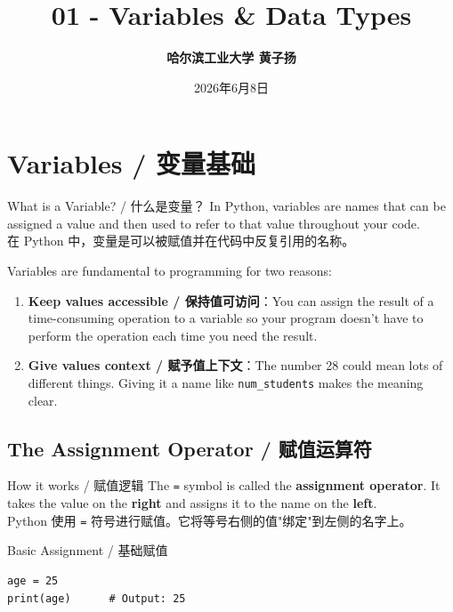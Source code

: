 \documentclass[11pt,a4paper]{article}
\title{\Huge \bfseries 01 - Variables \& Data Types}
\author{\Large \textbf{哈尔滨工业大学 \quad 黄子扬}}
\date{2026年6月8日}
\begin{document}
\maketitle
\tableofcontents
\newpage

\section{Variables / 变量基础}

\begin{concept}{What is a Variable? / 什么是变量？}
    In Python, variables are names that can be assigned a value and then used to refer to that value throughout your code. \\
    在 Python 中，变量是可以被赋值并在代码中反复引用的名称。

    Variables are fundamental to programming for two reasons:
    \begin{enumerate}[itemsep=0.3em]
        \item \textbf{Keep values accessible / 保持值可访问}：You can assign the result of a time-consuming operation to a variable so your program doesn't have to perform the operation each time you need the result.
        \item \textbf{Give values context / 赋予值上下文}：The number 28 could mean lots of different things. Giving it a name like \texttt{num\_students} makes the meaning clear.
    \end{enumerate}
\end{concept}

\subsection{The Assignment Operator / 赋值运算符}
\begin{concept}{How it works / 赋值逻辑}
    The \texttt{=} symbol is called the \textbf{assignment operator}. It takes the value on the \textbf{right} and assigns it to the name on the \textbf{left}. \\
    Python 使用 \texttt{=} 符号进行赋值。它将等号右侧的值"绑定"到左侧的名字上。
\end{concept}

\begin{examplebox}{Basic Assignment / 基础赋值}
\begin{lstlisting}
age = 25
print(age)      # Output: 25
\end{lstlisting}
\end{examplebox}
\end{document}
